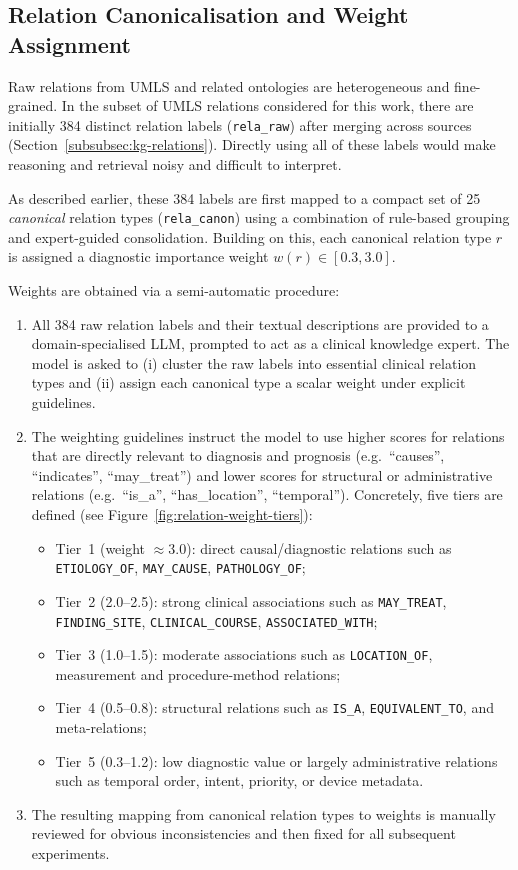 \subsection{Relation Canonicalisation and Weight Assignment}
\label{subsec:relation-weights}

Raw relations from UMLS and related ontologies are heterogeneous and fine-grained. In the subset of UMLS relations considered for this work, there are initially 384 distinct relation labels (\texttt{rela\_raw}) after merging across sources (Section~\ref{subsubsec:kg-relations}). Directly using all of these labels would make reasoning and retrieval noisy and difficult to interpret.

As described earlier, these 384 labels are first mapped to a compact set of 25 \emph{canonical} relation types (\texttt{rela\_canon}) using a combination of rule-based grouping and expert-guided consolidation. Building on this, each canonical relation type $r$ is assigned a diagnostic importance weight $w(r) \in [0.3, 3.0]$.

Weights are obtained via a semi-automatic procedure:

\begin{enumerate}
    \item All 384 raw relation labels and their textual descriptions are provided to a domain-specialised LLM, prompted to act as a clinical knowledge expert. The model is asked to (i) cluster the raw labels into essential clinical relation types and (ii) assign each canonical type a scalar weight under explicit guidelines.
    \item The weighting guidelines instruct the model to use higher scores for relations that are directly relevant to diagnosis and prognosis (e.g.\ ``causes'', ``indicates'', ``may\_treat'') and lower scores for structural or administrative relations (e.g.\ ``is\_a'', ``has\_location'', ``temporal''). Concretely, five tiers are defined (see Figure~\ref{fig:relation-weight-tiers}):
    \begin{itemize}
        \item Tier~1 (weight $\approx 3.0$): direct causal/diagnostic relations such as \texttt{ETIOLOGY\_OF}, \texttt{MAY\_CAUSE}, \texttt{PATHOLOGY\_OF};
        \item Tier~2 (2.0--2.5): strong clinical associations such as \texttt{MAY\_TREAT}, \texttt{FINDING\_SITE}, \texttt{CLINICAL\_COURSE}, \texttt{ASSOCIATED\_WITH};
        \item Tier~3 (1.0--1.5): moderate associations such as \texttt{LOCATION\_OF}, measurement and procedure-method relations;
        \item Tier~4 (0.5--0.8): structural relations such as \texttt{IS\_A}, \texttt{EQUIVALENT\_TO}, and meta-relations;
        \item Tier~5 (0.3--1.2): low diagnostic value or largely administrative relations such as temporal order, intent, priority, or device metadata.
    \end{itemize}
    \item The resulting mapping from canonical relation types to weights is manually reviewed for obvious inconsistencies and then fixed for all subsequent experiments.
\end{enumerate}

